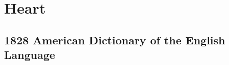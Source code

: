 \section{Heart}
	\label{HEART}
	

\subsection{1828 American Dictionary of the English Language} %
	\label{HEART-1828}

